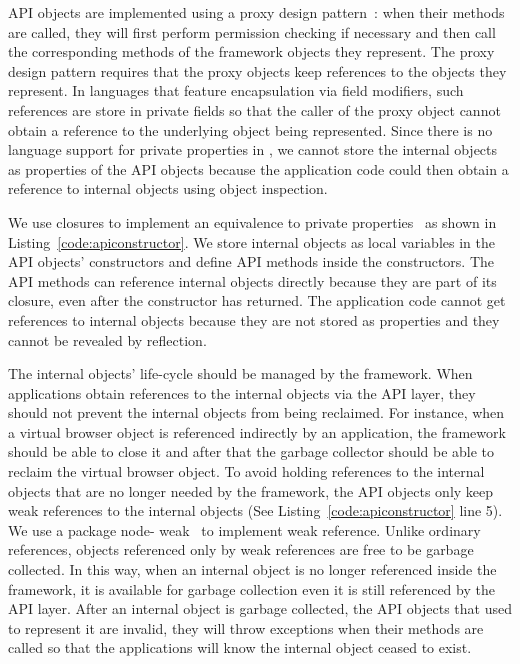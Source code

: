 API objects are implemented using a proxy design pattern~\cite{gamma1994design}:  
when their methods are
called, they will first perform permission checking if necessary and then call
the corresponding methods of the framework objects they represent. The proxy
design pattern requires that the proxy objects keep references to the objects they
represent. In languages that feature encapsulation via field modifiers, such 
references are store in private fields so
that the caller of the proxy object cannot obtain a reference to the 
underlying object being represented. Since there is no language support for private
properties in \js, we cannot  store the internal objects as properties of the
API objects because the application code could then obtain a reference to internal
objects using object inspection. 


We use closures to implement an equivalence to private properties~\cite{jsprivate} as
shown in Listing~\ref{code:apiconstructor}. We store internal objects as local
variables in the API objects' constructors and define API methods inside the
constructors. The API methods can reference internal objects
directly because they are part of its closure, even after the constructor has returned.
The application code cannot get references to internal objects because they 
are not stored as properties and they cannot be revealed by reflection.




The internal objects' life-cycle should be managed by the framework.
When applications obtain references to the internal objects via the API
layer, they should not prevent the internal objects from being reclaimed.
For instance, when a virtual browser object is referenced indirectly by
an application, the framework should be able to close it and after that
the garbage collector should be able to reclaim the virtual browser object.
To avoid holding references to the internal objects that are no longer needed
by the framework, the API objects only keep weak references to the internal
objects (See Listing~\ref{code:apiconstructor} line 5). We use a \nodejs{} package node-
weak~\cite{nodeweak} to implement weak reference. Unlike ordinary references,
objects referenced only by weak references are free to be garbage
collected.
In this way, when an internal object is no longer referenced
inside the framework, it is available for garbage collection even 
it is still referenced by the API layer.
After an internal object is garbage collected, the API objects that used to 
represent it are invalid, they
will throw exceptions when their methods are called so that
 the applications will know the internal object ceased to exist.



